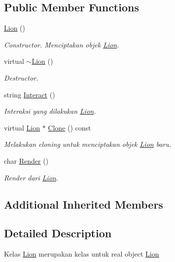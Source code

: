 \subsection*{Public Member Functions}
\begin{DoxyCompactItemize}
\item 
\hyperlink{classLion_a582202364024a9ce10e57f47c872dbc2}{Lion} ()
\begin{DoxyCompactList}\small\item\em Constructor. Menciptakan objek \hyperlink{classLion}{Lion}. \end{DoxyCompactList}\item 
virtual \hyperlink{classLion_a09c9c113e6ca2d7c7b304b009d61dc62}{$\sim$\+Lion} ()
\begin{DoxyCompactList}\small\item\em Destructor. \end{DoxyCompactList}\item 
string \hyperlink{classLion_a4c090a9b5f42b92c30d223b40435e167}{Interact} ()
\begin{DoxyCompactList}\small\item\em Interaksi yang dilakukan \hyperlink{classLion}{Lion}. \end{DoxyCompactList}\item 
virtual \hyperlink{classLion}{Lion} $\ast$ \hyperlink{classLion_ae63405ef106650644a8fcafc7393284e}{Clone} () const 
\begin{DoxyCompactList}\small\item\em Melakukan cloning untuk menciptakan objek \hyperlink{classLion}{Lion} baru. \end{DoxyCompactList}\item 
char \hyperlink{classLion_ad782de7c88e4a7aad01287a2ed64827c}{Render} ()
\begin{DoxyCompactList}\small\item\em Render dari \hyperlink{classLion}{Lion}. \end{DoxyCompactList}\end{DoxyCompactItemize}
\subsection*{Additional Inherited Members}


\subsection{Detailed Description}
Kelas \hyperlink{classLion}{Lion} merupakan kelas untuk real object \hyperlink{classLion}{Lion} 

